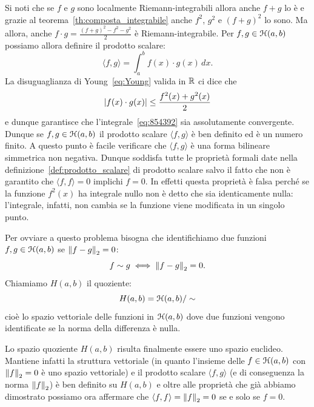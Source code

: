 Si noti che se $f$ e $g$ sono localmente Riemann-integrabili 
allora anche $f+g$ lo è 
e grazie al teorema~\ref{th:composta_integrabile} anche 
$f^2$, $g^2$ e $(f+g)^2$ lo sono.
Ma allora, anche $f\cdot g = \frac{(f+g)^2-f^2-g^2}{2}$ 
è Riemann-integrabile.
Per $f,g\in \mathcal H(a,b)$ possiamo allora definire il prodotto scalare:
\begin{equation}\label{eq:854392}
  \langle f, g\rangle = \int_a^b f(x) \cdot g(x)\, dx.
\end{equation}
La disuguaglianza di
Young~\eqref{eq:Young} valida in ${\mathbb R}$ ci dice che
\[
  {\left|f(x) \cdot g(x)\right|} \le \frac{f^2(x)+g^2(x)}{2}
\]
e dunque garantisce che l'integrale~\eqref{eq:854392}
sia assolutamente convergente. Dunque se $f,g\in \mathcal H(a,b)$
il prodotto scalare $\langle f,g\rangle$ è ben definito ed
è un numero finito. A questo punto è facile verificare
che $\langle f,g\rangle$ è una forma bilineare simmetrica
non negativa. Dunque soddisfa tutte le proprietà formali
date nella definizione~\ref{def:prodotto_scalare} di prodotto scalare
salvo il fatto che non è garantito che $\langle f,f\rangle = 0$
implichi $f=0$. In effetti questa proprietà è falsa perché
se la funzione $f^2(x)$ ha integrale nullo non è detto che sia
identicamente nulla: l'integrale, infatti, non cambia
se la funzione viene modificata in un singolo punto.

Per ovviare a questo problema bisogna che identifichiamo due
funzioni $f,g\in \mathcal H(a,b)$ se ${\left\Vert f-g\right\Vert}_2=0$:
\[
  f \sim g  \iff {\left\Vert f-g\right\Vert}_2=0.
\]
Chiamiamo $H(a,b)$ il quoziente:
\[
  H(a,b) = \mathcal H(a,b)/\sim
\]
cioè lo spazio vettoriale delle funzioni in $\mathcal H(a,b)$ dove due funzioni
vengono identificate se la norma della differenza è nulla.

Lo spazio quoziente $H(a,b)$ risulta finalmente essere uno spazio
euclideo.
Mantiene infatti la struttura vettoriale (in quanto l'insieme
delle $f\in \mathcal H(a,b)$ con ${\left\Vert f\right\Vert}_2=0$
è uno spazio vettoriale)
e il prodotto scalare $\langle f,g\rangle$ (e di conseguenza la norma ${\left\Vert f\right\Vert}_2$)
è ben definito su $H(a,b)$ e oltre alle proprietà che già abbiamo dimostrato
possiamo ora affermare che $\langle f,f\rangle = {\left\Vert f\right\Vert}_2=0$ se e solo se $f=0$.

